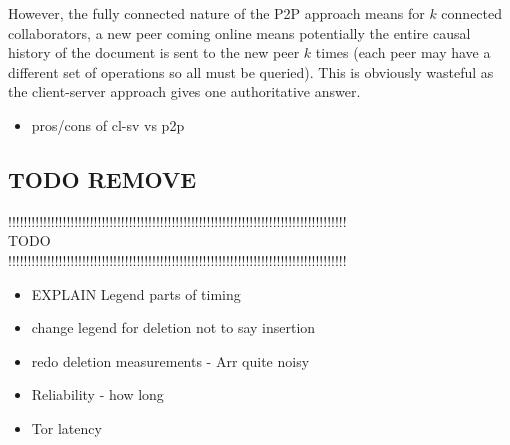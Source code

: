 \documentclass[diss.tex]{subfiles}
\begin{document}
However, the fully connected nature of the P2P approach means for $k$ connected collaborators, a new peer coming online means potentially the entire causal history of the document is sent to the new peer $k$ times (each peer may have a different set of operations so all must be queried). This is obviously wasteful as the client-server approach gives one authoritative answer.

\begin{itemize}
\item pros/cons of cl-sv vs p2p
\end{itemize}

\subsection{TODO REMOVE}



\begin{center}
!!!!!!!!!!!!!!!!!!!!!!!!!!!!!!!!!!!!!!!!!!!!!!!!!!!!!!!!!!!!!!!!!!!!!!!!!!!!!!!!!!!!!!!\\
TODO\\
!!!!!!!!!!!!!!!!!!!!!!!!!!!!!!!!!!!!!!!!!!!!!!!!!!!!!!!!!!!!!!!!!!!!!!!!!!!!!!!!!!!!!!!\\
\end{center}

\begin{itemize}
\item EXPLAIN Legend parts of timing
\item change legend for deletion not to say insertion
\item redo deletion measurements - Arr quite noisy
\item Reliability - how long
\item Tor latency
\end{itemize}
\end{document}
